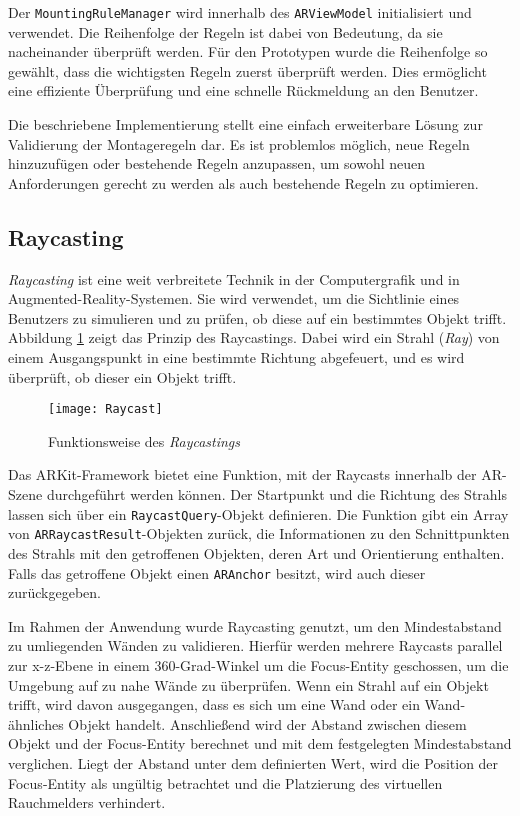 Der \texttt{MountingRuleManager} wird innerhalb des \texttt{ARViewModel} initialisiert und verwendet. Die Reihenfolge der Regeln ist dabei von Bedeutung, da sie nacheinander überprüft werden. Für den Prototypen wurde die Reihenfolge so gewählt, dass die wichtigsten Regeln zuerst überprüft werden. Dies ermöglicht eine effiziente Überprüfung und eine schnelle Rückmeldung an den Benutzer.

Die beschriebene Implementierung stellt eine einfach erweiterbare Lösung zur Validierung der Montageregeln dar. Es ist problemlos möglich, neue Regeln hinzuzufügen oder bestehende Regeln anzupassen, um sowohl neuen Anforderungen gerecht zu werden als auch bestehende Regeln zu optimieren.

\subsection{Raycasting}\label{Raycasting}

\textit{Raycasting} ist eine weit verbreitete Technik in der Computergrafik und in Augmented-Reality-Systemen. Sie wird verwendet, um die Sichtlinie eines Benutzers zu simulieren und zu prüfen, ob diese auf ein bestimmtes Objekt trifft. Abbildung \ref{fig:Raycasting} zeigt das Prinzip des Raycastings. Dabei wird ein Strahl (\textit{Ray}) von einem Ausgangspunkt in eine bestimmte Richtung abgefeuert, und es wird überprüft, ob dieser ein Objekt trifft.

\begin{figure}[ht]
    \centering
    \texttt{[image: Raycast]}
    \caption{Funktionsweise des \textit{Raycastings}}
    \label{fig:Raycasting}
\end{figure}

Das ARKit-Framework bietet eine Funktion, mit der Raycasts innerhalb der AR-Szene durchgeführt werden können. Der Startpunkt und die Richtung des Strahls lassen sich über ein \texttt{RaycastQuery}-Objekt definieren. Die Funktion gibt ein Array von \texttt{ARRaycastResult}-Objekten zurück, die Informationen zu den Schnittpunkten des Strahls mit den getroffenen Objekten, deren Art und Orientierung enthalten. Falls das getroffene Objekt einen \texttt{ARAnchor} besitzt, wird auch dieser zurückgegeben.

Im Rahmen der Anwendung wurde Raycasting genutzt, um den Mindestabstand zu umliegenden Wänden zu validieren. Hierfür werden mehrere Raycasts parallel zur x-z-Ebene in einem 360-Grad-Winkel um die Focus-Entity geschossen, um die Umgebung auf zu nahe Wände zu überprüfen. Wenn ein Strahl auf ein Objekt trifft, wird davon ausgegangen, dass es sich um eine Wand oder ein Wand-ähnliches Objekt handelt. Anschließend wird der Abstand zwischen diesem Objekt und der Focus-Entity berechnet und mit dem festgelegten Mindestabstand verglichen. Liegt der Abstand unter dem definierten Wert, wird die Position der Focus-Entity als ungültig betrachtet und die Platzierung des virtuellen Rauchmelders verhindert.

